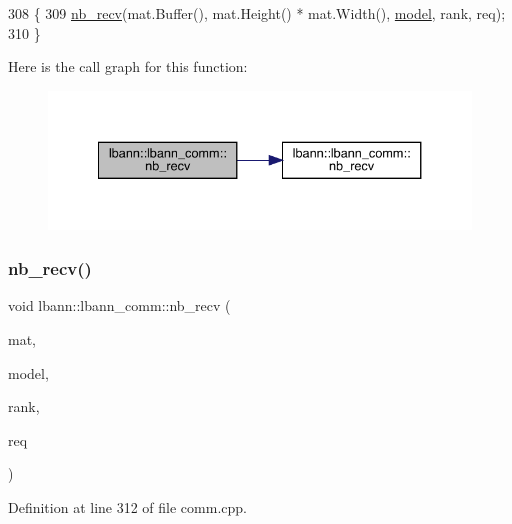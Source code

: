 \begin{DoxyCode}
308                                                       \{
309   \hyperlink{classlbann_1_1lbann__comm_aac24e8802602c73efddb455274e158f4}{nb\_recv}(mat.Buffer(), mat.Height() * mat.Width(), \hyperlink{namespacelbann_adee41f31f15f3906cbdcce4a1417eb56a20f35e630daf44dbfa4c3f68f5399d8c}{model}, rank, req);
310 \}
\end{DoxyCode}
Here is the call graph for this function\+:\nopagebreak
\begin{figure}[H]
\begin{center}
\leavevmode
\includegraphics[width=334pt]{classlbann_1_1lbann__comm_a8f850662e84e3efab19244d1ef6752d7_cgraph}
\end{center}
\end{figure}
\mbox{\label{classlbann_1_1lbann__comm_abec714b3f80361f104eaa004d906798b}} 
\subsubsection{\texorpdfstring{nb\+\_\+recv()}{nb\_recv()}\hspace{0.1cm}{\footnotesize\ttfamily [4/9]}}
{\footnotesize\ttfamily void lbann\+::lbann\+\_\+comm\+::nb\+\_\+recv (\begin{DoxyParamCaption}\item[{\hyperlink{base_8hpp_a0fab5387556805cfeac3e7e567bf66c5}{Dist\+Mat} \&}]{mat,  }\item[{int}]{model,  }\item[{int}]{rank,  }\item[{El\+::mpi\+::\+Request$<$ Data\+Type $>$ \&}]{req }\end{DoxyParamCaption})}



Definition at line 312 of file comm.\+cpp.


